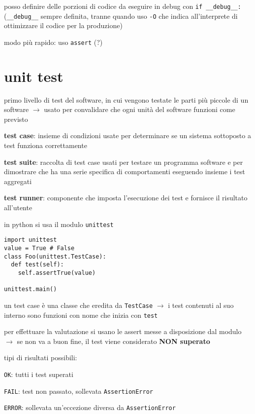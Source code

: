 posso definire delle porzioni di codice da eseguire in debug con \texttt{if __debug__:} (\texttt{__debug__} sempre definita, tranne quando uso \texttt{-O} che indica all'interprete di ottimizzare il codice per la produzione)

modo pi\`u rapido: uso \texttt{assert} (?)

\section{unit test}

primo livello di test del software, in cui vengono testate le parti pi\`u piccole di un software $\rightarrow$ usato per convalidare che ogni unit\`a del software funzioni come previsto

\textbf{test case}: insieme di condizioni usate per determinare se un sistema sottoposto a test funziona correttamente

\textbf{test suite}: raccolta di test case usati per testare un programma software e per dimostrare che ha una serie specifica di comportamenti eseguendo insieme i test aggregati

\textbf{test runner}: componente che imposta l'esecuzione dei test e fornisce il risultato all'utente

in python si usa il modulo \texttt{unittest}

\begin{verbatim}
import unittest
value = True # False
class Foo(unittest.TestCase):
  def test(self):
    self.assertTrue(value)
    
unittest.main()
\end{verbatim}

un test case \`e una classe che eredita da \texttt{TestCase} $\rightarrow$ i test contenuti al suo interno sono funzioni con nome che inizia con \texttt{test}

per effettuare la valutazione si usano le assert messe a disposizione dal modulo $\rightarrow$ se non va a buon fine, il test viene considerato \textbf{NON superato}

tipi di risultati possibili:

\texttt{OK}: tutti i test superati

\texttt{FAIL}: test non passato, sollevata \texttt{AssertionError}

\texttt{ERROR}: sollevata un'eccezione diversa da \texttt{AssertionError}

